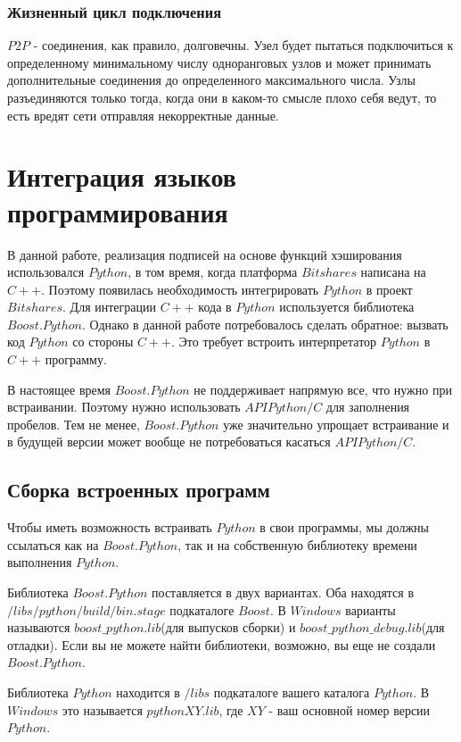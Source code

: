 \documentclass[a4paper, 14pt]{extarticle}
\begin{document}
\subsubsection{Жизненный цикл подключения}
$P2P$ - соединения, как правило, долговечны. Узел будет пытаться подключиться к определенному минимальному числу одноранговых узлов и может принимать дополнительные соединения до определенного максимального числа. Узлы разъединяются только тогда, когда они в каком-то смысле плохо себя ведут, то есть вредят сети отправляя некорректные данные.

\newpage

\section{Интеграция языков программирования}
В данной работе, реализация подписей на основе функций хэширования использовался $Python$, в том время, когда платформа $Bitshares$ написана на $C++$. Поэтому появилась необходимость интегрировать $Python$ в проект $Bitshares$.
Для интеграции $C++$ кода в $Python$ используется библиотека $Boost.Python$. Однако в данной работе потребовалось сделать обратное: вызвать код $Python$ со стороны $C++$. Это требует встроить интерпретатор $Python$ в $C++$ программу.

В настоящее время $Boost.Python$ не поддерживает напрямую все, что нужно при встраивании. Поэтому нужно использовать $API Python / C$ для заполнения пробелов. Тем не менее, $Boost.Python$ уже значительно упрощает встраивание и в будущей версии может вообще не потребоваться касаться $API Python / C$.

\subsection{Сборка встроенных программ}
Чтобы иметь возможность встраивать $Python$ в свои программы, мы должны ссылаться как на $Boost.Python$, так и на собственную библиотеку времени выполнения $Python$.

Библиотека $Boost.Python$ поставляется в двух вариантах. Оба находятся в $/libs/python/build/bin.stage$ подкаталоге $Boost$. В $Windows$ варианты называются $boost\_python.lib$(для выпусков сборки) и $boost\_python\_debug.lib$(для отладки). Если вы не можете найти библиотеки, возможно, вы еще не создали $Boost.Python$.

Библиотека $Python$ находится в $/libs$ подкаталоге вашего каталога $Python$. В $Windows$ это называется $pythonXY.lib$, где $XY$ - ваш основной номер версии $Python$.
\end{document}
